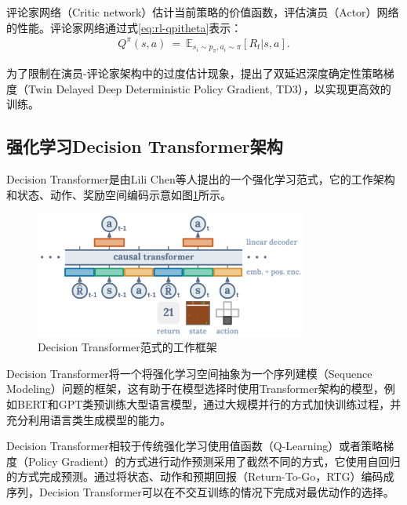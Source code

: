 评论家网络（Critic network）估计当前策略的价值函数，评估演员（Actor）网络的性能。评论家网络通过式\eqref{eq:rl-qpitheta}表示：
\begin{equation}
\begin{aligned}
   Q^\pi(s,a)~=~\mathbb{E}_{s_i\sim p_\pi,a_i\sim\pi}\left[R_t|s,a\right].
\end{aligned}
\label{eq:rl-qpitheta}
\end{equation} 

为了限制在演员-评论家架构中的过度估计现象，提出了双延迟深度确定性策略梯度（Twin Delayed Deep Deterministic Policy Gradient, TD3）\cite{fujimoto2018addressing}，以实现更高效的训练。



\subsection{强化学习Decision Transformer架构}
Decision Transformer\cite{chen2021decision}是由Lili Chen等人提出的一个强化学习范式，它的工作架构和状态、动作、奖励空间编码示意如图\ref{fig:decision_trans_archi}所示。

\begin{figure} [ht]
\centering
\includegraphics[width=0.8\textwidth]{figures/chap02/decision_transformer.png} 
\caption{Decision Transformer范式的工作框架\cite{chen2021decision}}
\label{fig:decision_trans_archi}
\end{figure}

Decision Transformer将一个将强化学习空间抽象为一个序列建模（Sequence Modeling）问题的框架，这有助于在模型选择时使用Transformer架构的模型，例如BERT\cite{koroteev2021bert}和GPT\cite{achiam2023gpt}类预训练大型语言模型，通过大规模并行的方式加快训练过程，并充分利用语言类生成模型的能力。

Decision Transformer相较于传统强化学习使用值函数（Q-Learning）或者策略梯度（Policy Gradient）的方式进行动作预测采用了截然不同的方式，它使用自回归的方式完成预测。通过将状态、动作和预期回报（Return-To-Go，RTG）编码成序列，Decision Transformer可以在不交互训练的情况下完成对最优动作的选择。




